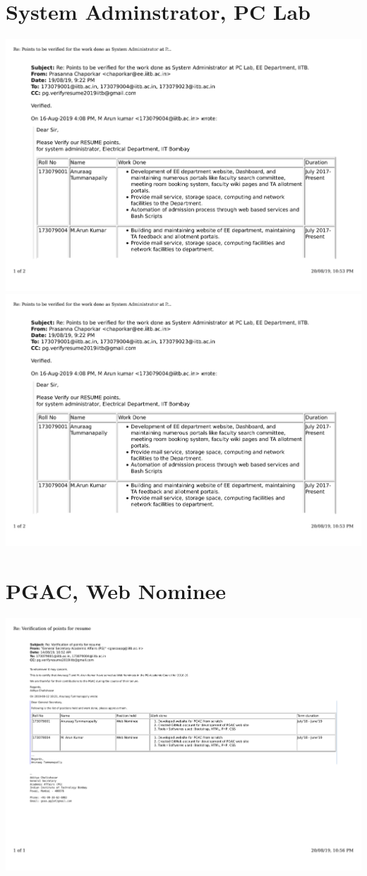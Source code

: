 \documentclass{article}
\begin{document}
\section{ System Adminstrator, PC Lab}
	\includegraphics[page=1, scale=0.5]{proofs/sysad_work.pdf}\\
	\includegraphics[page=2, scale=0.5]{proofs/sysad_work.pdf}\\
\section{ PGAC, Web Nominee}
	\includegraphics[page=1, scale=0.5]{proofs/pgac.pdf}\\
\end{document}
